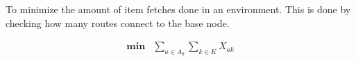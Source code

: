 To minimize the amount of item fetches done in an environment. This is done by checking how many routes connect to the base node.

\begin{align*}
    \mathbf{min} & \sum_{a \in A_0} \sum_{k \in K} {X_{ak}}
\end{align*}
